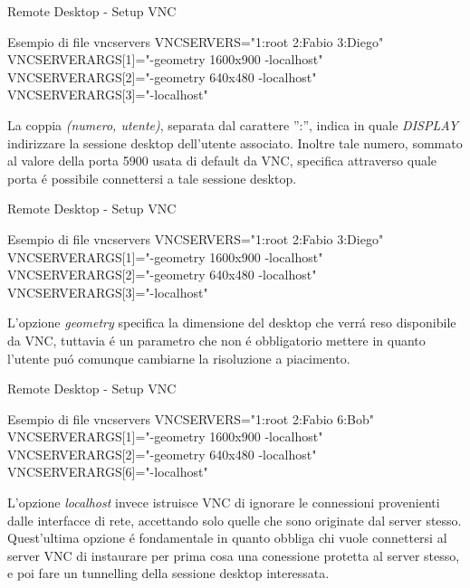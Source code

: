 \documentclass{beamer}
\begin{document}
\begin{frame}{Remote Desktop - Setup VNC}
\begin{exampleblock}{Esempio di file vncservers}
{\small
VNCSERVERS="1:root 2:Fabio 3:Diego"
\newline
VNCSERVERARGS[1]="-geometry 1600x900  -localhost"
\newline
VNCSERVERARGS[2]="-geometry 640x480 -localhost"
\newline
VNCSERVERARGS[3]="-localhost"
}
\end{exampleblock}
La coppia \emph{(numero, utente)}, separata dal carattere '':'', indica in quale \emph{DISPLAY} indirizzare la sessione desktop
dell'utente associato. Inoltre tale numero, sommato al valore della porta 5900 usata di default da VNC, specifica attraverso quale
porta \'e possibile connettersi a tale sessione desktop.
\end{frame}


\begin{frame}{Remote Desktop - Setup VNC}
\begin{exampleblock}{Esempio di file vncservers}
{\small
VNCSERVERS="1:root 2:Fabio 3:Diego"
\newline
VNCSERVERARGS[1]="-geometry 1600x900  -localhost"
\newline
VNCSERVERARGS[2]="-geometry 640x480 -localhost"
\newline
VNCSERVERARGS[3]="-localhost"
}
\end{exampleblock}
L'opzione \emph{geometry} specifica la dimensione del desktop che verr\'a reso disponibile da VNC, tuttavia \'e un parametro che
non \'e obbligatorio mettere in quanto l'utente pu\'o comunque cambiarne la risoluzione a piacimento.
\end{frame}


\begin{frame}{Remote Desktop - Setup VNC}
\begin{exampleblock}{Esempio di file vncservers}
{\small
VNCSERVERS="1:root 2:Fabio 6:Bob"
\newline
VNCSERVERARGS[1]="-geometry 1600x900  -localhost"
\newline
VNCSERVERARGS[2]="-geometry 640x480 -localhost"
\newline
VNCSERVERARGS[6]="-localhost"
}
\end{exampleblock}
L'opzione  \emph{localhost} invece istruisce VNC di ignorare le connessioni provenienti dalle interfacce di rete, accettando solo
 quelle che sono originate dal server stesso. Quest'ultima opzione \'e fondamentale in quanto obbliga chi vuole connettersi al
 server VNC di instaurare per prima cosa una conessione protetta al server stesso, e poi fare un tunnelling della sessione desktop
 interessata.
\end{frame}
\end{document}
